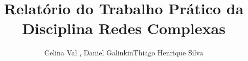 \title{Relatório do Trabalho Prático da Disciplina Redes Complexas}

\author{Celina Val , Daniel GalinkinThiago Henrique
Silva}


\address{Departamento de Ciência da Computação\\
   Universidade Federal de Minas Gerais (UFMG)\\
   31.270-010 -- Belo Horizonte -- MG -- Brasil
}                                                                      

\maketitle

